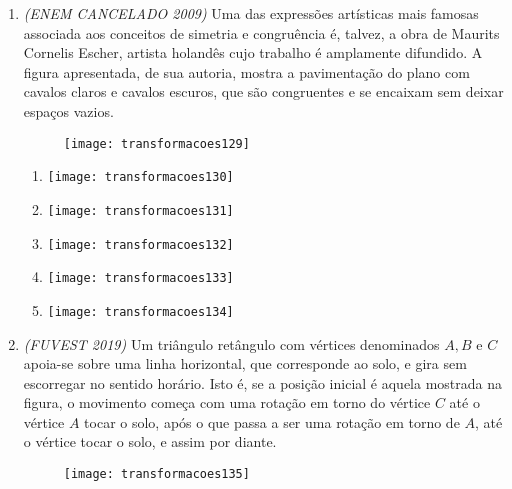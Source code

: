 \begin{enumerate}
\item \textit{(ENEM CANCELADO 2009)} Uma das expressões artísticas mais famosas associada aos conceitos de simetria e congruência é, talvez, a obra de Maurits Cornelis Escher, artista holandês cujo trabalho é amplamente difundido. A figura apresentada, de sua autoria, mostra a pavimentação do plano com cavalos claros e cavalos escuros, que são congruentes e se encaixam sem deixar espaços vazios.

\begin{figure}[H]
\centering

\texttt{[image: transformacoes129]}
\end{figure}

\begin{multicols}{2}
\begin{enumerate}
\item {}
{
\texttt{[image: transformacoes130]}
}

\item {}
{
\texttt{[image: transformacoes131]}
}

\item {}
{
\texttt{[image: transformacoes132]}
}

\item {}
{
\texttt{[image: transformacoes133]}
}

\item {}
{
\texttt{[image: transformacoes134]}
}
\end{enumerate}
\end{multicols}




\item \textit{(FUVEST 2019)} Um triângulo retângulo com vértices denominados $A, B$ e $C$ apoia-se sobre uma linha horizontal, que corresponde ao solo, e gira sem escorregar no sentido horário. Isto é, se a posição inicial é aquela mostrada na figura, o movimento começa com uma rotação em torno do vértice $C$ até o vértice $A$ tocar o solo, após o que passa a ser uma rotação em torno de $A$, até o vértice tocar o solo, e assim por diante.

\begin{figure}[H]
\centering

\texttt{[image: transformacoes135]}
\end{figure}



\end{enumerate}
